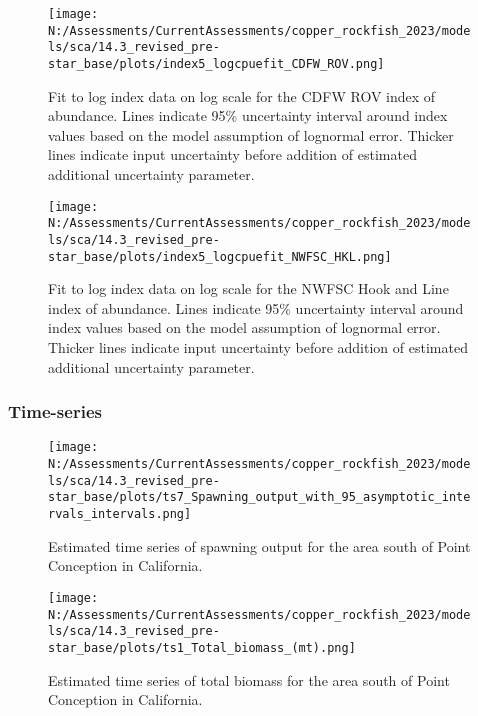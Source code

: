 \documentclass[11pt,
  english,
  letterpaper,
]{article}
\begin{document}
\pagebreak

\begin{figure}
\centering
\texttt{[image: N:/Assessments/CurrentAssessments/copper\_rockfish\_2023/models/sca/14.3\_revised\_pre-star\_base/plots/index5\_logcpuefit\_CDFW\_ROV.png]}
\caption{Fit to log index data on log scale for the CDFW ROV index of abundance. Lines indicate 95\% uncertainty interval around index values based on the model assumption of lognormal error. Thicker lines indicate input uncertainty before addition of estimated additional uncertainty parameter.\label{fig:rov-index-fit}}
\end{figure}

\pagebreak

\begin{figure}
\centering
\texttt{[image: N:/Assessments/CurrentAssessments/copper\_rockfish\_2023/models/sca/14.3\_revised\_pre-star\_base/plots/index5\_logcpuefit\_NWFSC\_HKL.png]}
\caption{Fit to log index data on log scale for the NWFSC Hook and Line index of abundance. Lines indicate 95\% uncertainty interval around index values based on the model assumption of lognormal error. Thicker lines indicate input uncertainty before addition of estimated additional uncertainty parameter.\label{fig:nwfsc-hkl-index-fit}}
\end{figure}

\pagebreak

\hypertarget{time-series}{%
\subsubsection{Time-series}\label{time-series}}

\begin{figure}
\centering
\texttt{[image: N:/Assessments/CurrentAssessments/copper\_rockfish\_2023/models/sca/14.3\_revised\_pre-star\_base/plots/ts7\_Spawning\_output\_with\_95\_asymptotic\_intervals\_intervals.png]}
\caption{Estimated time series of spawning output for the area south of Point Conception in California.\label{fig:ssb}}
\end{figure}

\pagebreak

\begin{figure}
\centering
\texttt{[image: N:/Assessments/CurrentAssessments/copper\_rockfish\_2023/models/sca/14.3\_revised\_pre-star\_base/plots/ts1\_Total\_biomass\_(mt).png]}
\caption{Estimated time series of total biomass for the area south of Point Conception in California.\label{fig:tot-bio}}
\end{figure}
\end{document}
